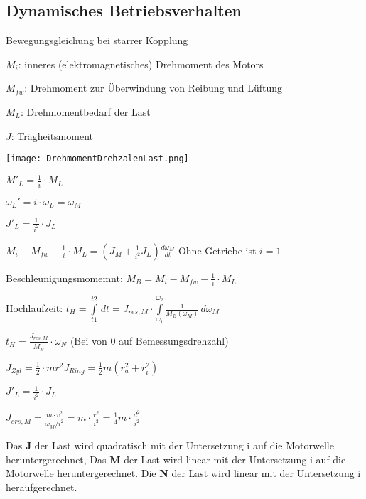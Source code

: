 \documentclass[german]{latex4ei/latex4ei_sheet}
\begin{document}
	\begin{sectionbox}
		\subsection{Dynamisches Betriebsverhalten}
			\begin{symbolbox}{Bewegungsgleichung bei starrer Kopplung}
				\item $M_i$: inneres (elektromagnetisches) Drehmoment des Motors
				\item $M_{fw}$: Drehmoment zur Überwindung von Reibung und Lüftung
				\item $M_L$: Drehmomentbedarf der Last
				\item $J$: Trägheitsmoment
				\item \texttt{[image: DrehmomentDrehzalenLast.png]}
				\item $M'_L = \frac{1}{i}\cdot M_L$
				\item $\omega_L' = i\cdot \omega_L = \omega_M$
				\item $J'_L=\frac{1}{i^2}\cdot J_L$
				\item $M_i-M_{fw}-\frac{1}{i}\cdot M_L= \left(J_M+\frac{1}{i^2}J_L\right)\frac{d\omega_M}{dt}$ Ohne Getriebe ist $i=1$
				\item Beschleunigungsmomemnt: $M_B = M_i-M_{fw}-\frac{1}{i}\cdot M_L$
				\item Hochlaufzeit: $t_H = \int\limits_{t1}^{t2}\,dt = J_{res,M}\cdot \int\limits_{\omega_1}^{\omega_2}\frac{1}{M_B(\omega_M)}\, d\omega_M$
				\item $t_H = \frac{J_{res,M}}{\overline{M}_B}\cdot \omega_N$ (Bei von 0 auf Bemessungsdrehzahl)
				\item $J_{Zyl} = \frac{1}{2}\cdot m r^2$\qquad $J_{Ring} = \frac{1}{2} m (r_a^2+r_i^2)$
				\item $J'_L = \frac{1}{i^2}\cdot J_L$
				\item $J_{ers, M} = \frac{m\cdot v^2}{\omega_M/i^2} = m\cdot \frac{r^2}{i^2} =\frac{1}{4}m\cdot \frac{d^2}{i^2}$
				\item Das \textbf{J}  der Last wird quadratisch mit der Untersetzung i auf die
				Motorwelle heruntergerechnet, Das \textbf{M}  der Last wird linear mit der Untersetzung i auf die Motorwelle
				heruntergerechnet. Die \textbf{N} der Last wird linear mit der Untersetzung i heraufgerechnet.
			\end{symbolbox}
	\end{sectionbox}
\end{document}
